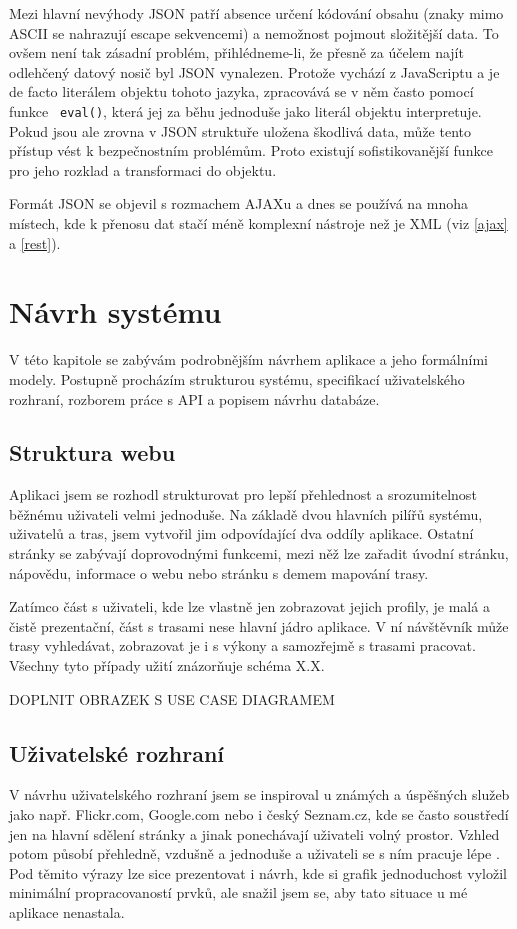Mezi hlavní nevýhody JSON patří absence určení kódování obsahu
(znaky mimo ASCII se nahrazují escape sekvencemi) a nemožnost pojmout
složitější data. To ovšem není tak zásadní problém,
přihlédneme-li, že přesně za účelem najít odlehčený datový nosič byl
JSON vynalezen. Protože vychází z JavaScriptu a je de facto literálem
objektu tohoto jazyka, zpracovává se v něm často pomocí funkce {\tt
eval()}, která jej za běhu jednoduše jako literál objektu
interpretuje. Pokud jsou ale zrovna v JSON struktuře uložena škodlivá
data, může tento přístup vést k bezpečnostním problémům. Proto
existují sofistikovanější funkce pro jeho rozklad a transformaci do
objektu. \cite{json}

Formát JSON se objevil s rozmachem AJAXu a dnes se používá na mnoha
místech, kde k přenosu dat stačí méně komplexní nástroje než je XML
(viz \ref{ajax} a \ref{rest}).

\chapter{Návrh systému}
V této kapitole se zabývám podrobnějším návrhem aplikace a jeho
formálními modely. Postupně procházím strukturou systému, specifikací
uživatelského rozhraní, rozborem práce s API a popisem návrhu databáze. 

\section{Struktura webu}
Aplikaci jsem se rozhodl strukturovat pro lepší přehlednost a
srozumitelnost běžnému uživateli velmi jednoduše. Na základě dvou
hlavních pilířů systému, uživatelů a tras, jsem vytvořil jim
odpovídající dva oddíly aplikace. Ostatní stránky se zabývají
doprovodnými funkcemi, mezi něž lze zařadit úvodní stránku, nápovědu,
informace o webu nebo stránku s demem mapování trasy.

Zatímco část s uživateli, kde lze vlastně jen zobrazovat jejich
profily, je malá a čistě prezentační, část s trasami nese hlavní
jádro aplikace. V ní návštěvník může trasy vyhledávat, zobrazovat je
i s výkony a samozřejmě s trasami pracovat. Všechny tyto případy
užití znázorňuje schéma X.X.

DOPLNIT OBRAZEK S USE CASE DIAGRAMEM

\section{Uživatelské rozhraní}
V návrhu uživatelského rozhraní jsem se inspiroval u známých a
úspěšných služeb jako např. Flickr.com, Google.com nebo i český
Seznam.cz, kde se často soustředí jen na hlavní sdělení stránky a
jinak ponechávají uživateli volný prostor. Vzhled potom působí
přehledně, vzdušně a jednoduše a uživateli se s ním pracuje lépe
\cite{design}. Pod těmito výrazy lze sice prezentovat i návrh, kde si
grafik jednoduchost vyložil minimální propracovaností prvků, ale
snažil jsem se, aby tato situace u mé aplikace nenastala.


